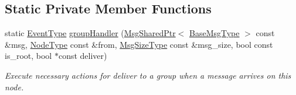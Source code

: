 \subsection*{Static Private Member Functions}
\begin{DoxyCompactItemize}
\item 
static \hyperlink{namespacevt_a009267401def7ae8bf201892222d060f}{Event\+Type} \hyperlink{structvt_1_1group_1_1_group_manager_a0670dfd6a524c967c687dcbee6e09ace}{group\+Handler} (\hyperlink{namespacevt_ab2b3d506ec8e8d1540aede826d84a239}{Msg\+Shared\+Ptr}$<$ \hyperlink{namespacevt_a44d0d4e144748f2b19a1cfd962f50338}{Base\+Msg\+Type} $>$ const \&msg, \hyperlink{namespacevt_a866da9d0efc19c0a1ce79e9e492f47e2}{Node\+Type} const \&from, \hyperlink{namespacevt_abfa009d900299ac1df967b40ea8f2c8a}{Msg\+Size\+Type} const \&msg\+\_\+size, bool const is\+\_\+root, bool $\ast$const deliver)
\begin{DoxyCompactList}\small\item\em Execute necessary actions for deliver to a group when a message arrives on this node. \end{DoxyCompactList}\end{DoxyCompactItemize}
